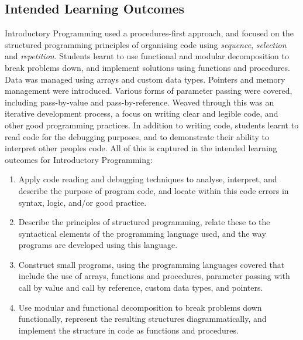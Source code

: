 \cite{Gregor:2008}


\subsection{Intended Learning Outcomes} %
\label{sec:intro:intended_learning_outcomes}



Introductory Programming used a procedures-first approach, and focused on the structured programming principles of organising code using \emph{sequence}, \emph{selection} and \emph{repetition}. Students learnt to use functional and modular decomposition to break problems down, and implement solutions using functions and procedures. Data was managed using arrays and custom data types. Pointers and memory management were introduced. Various forms of parameter passing were covered, including pass-by-value and pass-by-reference. Weaved through this was an iterative development process, a focus on writing clear and legible code, and other good programming practices. In addition to writing code, students learnt to read code for the debugging purposes, and to demonstrate their ability to interpret other peoples code. All of this is captured in the intended learning outcomes for Introductory Programming:
\begin{enumerate}
	\item Apply code reading and debugging techniques to analyse, interpret, and describe the purpose of program code, and locate within this code errors in syntax, logic, and/or good practice.
	\item Describe the principles of structured programming, relate these to the syntactical elements of the programming language used, and the way programs are developed using this language.
	\item Construct small programs, using the programming languages covered that include the use of arrays, functions and procedures, parameter passing with call by value and call by reference, custom data types, and pointers.
	\item Use modular and functional decomposition to break problems down functionally, represent the resulting structures diagrammatically, and implement the structure in code as functions and procedures.
\end{enumerate}








